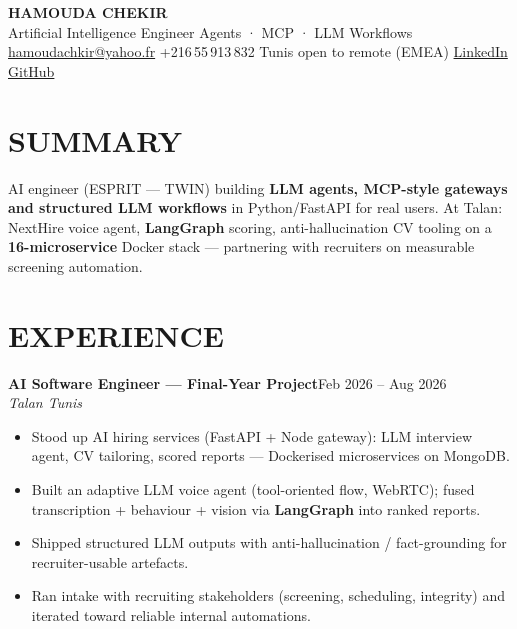 \documentclass[10pt,a4paper]{article}
\newcommand{\TargetTitle}{Artificial Intelligence Engineer \textbar{} Agents · MCP · LLM Workflows}
\newcommand{\job}[3]{%
  \textbf{\color{primary}#1}\hfill{\color{muted}\small #2}\\[-1pt]
  {\color{accent}\textit{#3}}\\[1pt]
  \begin{itemize}
}
\newcommand{\contactsep}{\hspace{4pt}{\color{rulecolor}|}\hspace{4pt}}
\begin{document}
{\fontsize{20}{24}\selectfont\bfseries\color{primary}HAMOUDA CHEKIR}\\[1pt]
{\normalsize\color{accent}\TargetTitle}\\[3pt]
{\footnotesize\color{muted}%
  \hspace{2pt}\href{mailto:hamoudachkir@yahoo.fr}{hamoudachkir@yahoo.fr}%
  \contactsep
  \hspace{2pt}+216\,55\,913\,832%
  \contactsep
  \hspace{2pt}Tunis \textbar{} open to remote (EMEA)%
  \contactsep
  \hspace{2pt}\href{https://www.linkedin.com/in/hamouda-chekir-5053572b4}{LinkedIn}%
  \contactsep
  \hspace{2pt}\href{https://github.com/hamoudachekir}{GitHub}%
}\\[4pt]

\section{SUMMARY}
AI engineer (ESPRIT — TWIN) building \textbf{LLM agents, MCP-style gateways and structured LLM workflows} in Python/FastAPI for real users.
At Talan: NextHire voice agent, \textbf{LangGraph} scoring, anti-hallucination CV tooling on a \textbf{16-microservice} Docker stack — partnering with recruiters on measurable screening automation.

\section{EXPERIENCE}

\job{AI Software Engineer — Final-Year Project}{Feb 2026 -- Aug 2026}{Talan \textbar{} Tunis}
  \item Stood up AI hiring services (FastAPI + Node gateway): LLM interview agent, CV tailoring, scored reports — Dockerised microservices on MongoDB.
  \item Built an adaptive LLM voice agent (tool-oriented flow, WebRTC); fused transcription + behaviour + vision via \textbf{LangGraph} into ranked reports.
  \item Shipped structured LLM outputs with anti-hallucination / fact-grounding for recruiter-usable artefacts.
  \item Ran intake with recruiting stakeholders (screening, scheduling, integrity) and iterated toward reliable internal automations.
\end{itemize}
\end{document}
